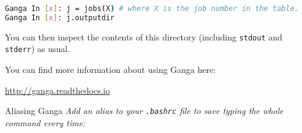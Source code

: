 \begin{lstlisting}[gobble=0,numbers=none,language=bash]
Ganga In [x]: j = jobs(X) # where X is the job number in the table.
Ganga In [x]: j.outputdir
\end{lstlisting}

You can then inspect the contents of this directory
(including \texttt{stdout} and \texttt{stderr}) as usual.

You can find more information about using Ganga here:

\href{http://ganga.readthedocs.io}{http://ganga.readthedocs.io}

\begin{hintbox}{Aliasing Ganga}
\emph{Add an alias to your \texttt{.bashrc} file
to save typing the whole command every time:}

\end{hintbox}
